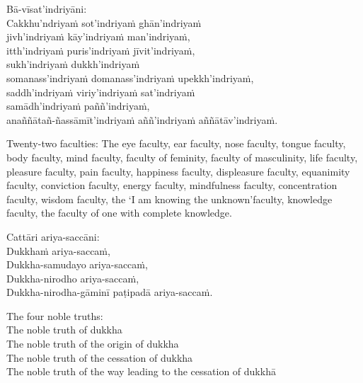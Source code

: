 \suttaRef{[MN 115]}

Bā-vīsat'indriyāni:\hyperlink{endnote128-appendix}{\hypertarget{endnote128-body}{}}\\
Cakkhu'ndriyaṁ sot'indriyaṁ ghān'indriyaṁ\\
jivh'indriyaṁ kāy'indriyaṁ man'indriyaṁ,\\
itth'indriyaṁ puris'indriyaṁ jīvit'indriyaṁ,\\
sukh'indriyaṁ dukkh'indriyaṁ\\
somanass'indriyaṁ domanass'indriyaṁ upekkh'indriyaṁ,\\
saddh'indriyaṁ viriy'indriyaṁ sat'indriyaṁ\\
samādh'indriyaṁ paññ'indriyaṁ,\\
anaññātañ-ñassāmīt'indriyaṁ aññ'indriyaṁ aññātāv'indriyaṁ.

\begin{english-hang-verses}
  Twenty-two faculties: The eye faculty, ear faculty, nose faculty, tongue faculty, body faculty, mind faculty, faculty of feminity, faculty of masculinity, life faculty, pleasure faculty, pain faculty, happiness faculty, displeasure faculty, equanimity faculty, conviction faculty, energy faculty, mindfulness faculty, concentration faculty, wisdom faculty, the `I am knowing the unknown'faculty, knowledge faculty, the faculty of one with complete knowledge.
\end{english-hang-verses}

\suttaRef{[Vibh]}

Cattāri ariya-saccāni:\\
Dukkhaṁ ariya-saccaṁ,\\
Dukkha-samudayo ariya-saccaṁ,\\
Dukkha-nirodho ariya-saccaṁ,\\
Dukkha-nirodha-gāminī paṭipadā ariya-saccaṁ.

\begin{english-verses}
  The four noble truths:\\
  The noble truth of dukkha\\
  The noble truth of the origin of dukkha\\
  The noble truth of the cessation of dukkha\\
  The noble truth of the way leading to the cessation of dukkhā
\end{english-verses}

